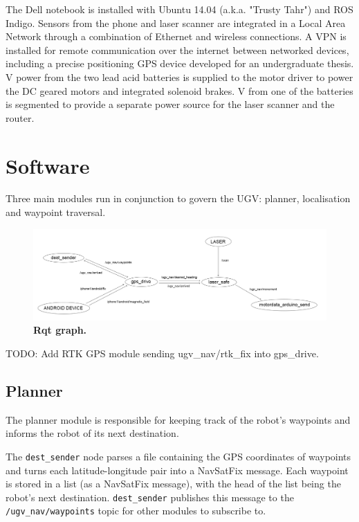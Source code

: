 \documentclass[titlepage,12pt,a4paper]{article}
\begin{document}
The Dell notebook is installed with Ubuntu 14.04 (a.k.a. "Trusty Tahr") and ROS Indigo. Sensors from the phone and laser scanner are integrated in a Local Area Network through a combination of Ethernet and wireless connections. A VPN is installed for remote communication over the internet between networked devices, including a precise positioning GPS device developed for an undergraduate thesis. \unit[24]{V} power from the two lead acid batteries is supplied to the motor driver to power the DC geared motors and integrated solenoid brakes. \unit[12]{V} from one of the batteries is segmented to provide a separate power source for the laser scanner and the router.

\pagebreak
\section{Software}

Three main modules run in conjunction to govern the UGV: planner, localisation and waypoint traversal.

\begin{figure}[h]
	\centering
	\includegraphics[scale=0.255]{figures/rqt.png}
	\caption{\textbf{Rqt graph.}}
\end{figure}

TODO: Add RTK GPS module sending ugv\_nav/rtk\_fix into gps\_drive.

\subsection{Planner}
The planner module is responsible for keeping track of the robot's waypoints and informs the robot of its next destination. 

The \verb|dest_sender| node parses a file containing the GPS coordinates of waypoints and turns each latitude-longitude pair into a NavSatFix message. Each waypoint is stored in a list (as a NavSatFix message), with the head of the list being the robot's next destination. \verb|dest_sender| publishes this message to the \verb|/ugv_nav/waypoints| topic for other modules to subscribe to.
\end{document}
